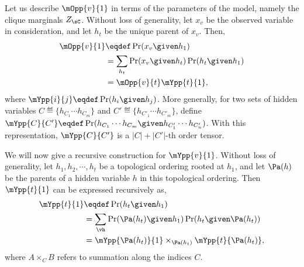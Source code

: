 %
%
%
%
%

Let us describe $\mOpp{v}{1}$ in terms of the parameters of the model,
  namely the clique marginals $Z_\sC$.
Without loss of generality, let $x_v$ be the observed variable in
  consideration, and let $h_t$ be the unique parent of $x_v$.
Then, 
\begin{align*}
  \mOpp{v}{1} &\eqdef \Pr( x_v \given h_1 )  \\
              &= \sum_{h_t} \Pr( x_v \given h_t ) \Pr( h_t \given h_1 ) \\
              &= \mOpp{v}{t} \mYpp{t}{1},
\end{align*}
where $\mYpp{i}{j} \eqdef \Pr( h_i \given h_j )$. 
More generally, for two sets of hidden variables $C \eqdef \{h_{C_1}
\cdots h_{C_m} \}$ and $C' \eqdef \{h_{C'_1} \cdots h_{C'_m} \}$, 
define $\mYpp{C}{C'} \eqdef \Pr( h_{C_1} \cdots h_{C_m} \given h_{C'_1}
\cdots h_{C'_n} )$. 
With this representation, $\mYpp{C}{C'}$ is a $|C| + |C'|$-th order
tensor.
  
We will now give a recursive construction for $\mYpp{v}{1}$.
Without loss of generality, let $h_1, h_2, \cdots, h_t$ be a topological
  ordering rooted at $h_1$,
and let $\Pa(h)$ be the parents of a hidden variable $h$ in
  this topological ordering.
Then $\mYpp{t}{1}$ can be expressed recursively as,
\begin{align*}
  \mYpp{t}{1} &\eqdef \Pr( h_t \given h_1 )  \\
  &= \sum_{\vh} \Pr( \Pa(h_t) \given h_1 ) \Pr( h_t \given \Pa(h_t) ) \\
  &= \mYpp{ \Pa(h_t) }{1} \times_{\Pa(h_t)} \mYpp{t}{\Pa(h_t)},
\end{align*}
where $A \times_{C} B$ refers to summation along the indices $C$.

